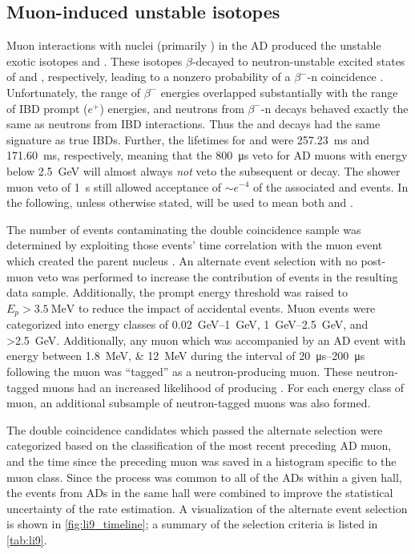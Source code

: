 \subsection{Muon-induced unstable isotopes}
\label{subsec:li9}

Muon interactions with nuclei (primarily ) in the AD
produced the unstable exotic isotopes \li{} and \he{}.
These isotopes $\beta$-decayed to neutron-unstable excited states
of  and , respectively,
leading to a nonzero probability of a $\beta^{-}$-n coincidence \cite{kamland_li9}.
Unfortunately, the range of $\beta^-$ energies overlapped substantially
with the range of IBD prompt ($e^+$) energies,
and neutrons from $\beta^-$-n decays behaved
exactly the same as neutrons from IBD interactions.
Thus the \li{} and \he{} decays had the same signature as true IBDs.
Further, the lifetimes for \li{} and \he{} were
\SI{257.23}{\ms} and \SI{171.60}{\ms}, respectively,
meaning that the \SI{800}{\us} veto for AD muons
with energy below \SI{2.5}{\GeV} will almost always
\emph{not} veto the subsequent \li{} or \he{} decay.
The shower muon veto of \SI{1}{\s} still allowed acceptance of
$\sim e^{-4}$ of the associated \li{} and \he{} events.
In the following, unless otherwise stated,
\li{} will be used to mean both \li{} and \he{}.

The number of \li{} events contaminating the double coincidence sample
was determined by exploiting those events' time correlation
with the muon event which created the parent \li{} nucleus \cite{jinjing_2020may}.
An alternate event selection with no post-muon veto
was performed to increase the contribution of \li{} events
in the resulting data sample.
Additionally, the prompt energy threshold
was raised to $E_p > \SI{3.5}{\MeV}$
to reduce the impact of accidental events.
Muon events were categorized into energy classes
of \SIrange{0.02}{1}{\GeV}, \SIrange{1}{2.5}{\GeV},
and \SI{>2.5}{\GeV}.
Additionally, any muon which was accompanied by
an AD event with energy between \SIlist{1.8;12}{\MeV}
during the interval of \SIrange{20}{200}{\us} following the muon
was ``tagged'' as a neutron-producing muon.
These neutron-tagged muons had an increased likelihood
of producing \li{}.
For each energy class of muon,
an additional subsample of neutron-tagged muons was also formed.

The double coincidence candidates which passed the alternate selection
were categorized based on the classification
of the most recent preceding AD muon,
and the time since the preceding muon
was saved in a histogram specific to the muon class.
Since the \li{} process was common to all of the ADs within a given hall,
the events from ADs in the same hall were combined
to improve the statistical uncertainty of the rate estimation.
A visualization of the alternate event selection
is shown in \cref{fig:li9_timeline};
a summary of the selection criteria is listed in \cref{tab:li9}.

